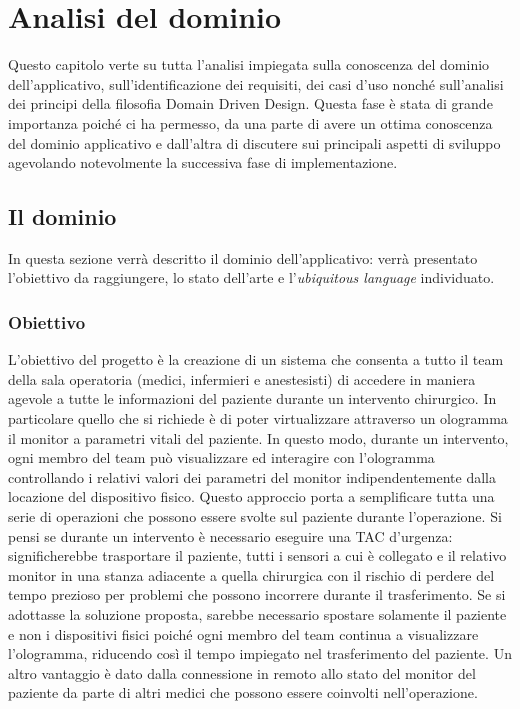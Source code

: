 
\chapter{Analisi del dominio}
Questo capitolo verte su tutta l'analisi impiegata sulla conoscenza del dominio dell'applicativo, sull'identificazione dei requisiti, dei casi d'uso nonché sull'analisi dei principi della filosofia Domain Driven Design. \newline \newline Questa fase è stata di grande importanza poiché ci ha permesso, da una parte di avere un ottima conoscenza del dominio applicativo e dall'altra di discutere sui principali aspetti di sviluppo agevolando notevolmente la successiva fase di implementazione.

\section{Il dominio}
In questa sezione verrà descritto il dominio dell'applicativo: verrà presentato l'obiettivo da raggiungere, lo stato dell'arte e l'\textit{ubiquitous language} individuato.
 
\subsection{Obiettivo}

L'obiettivo del progetto è la creazione di un sistema che consenta a tutto il team della sala operatoria (medici, infermieri e anestesisti) di accedere in maniera agevole a tutte le informazioni del paziente durante un intervento chirurgico. In particolare quello che si richiede è di poter virtualizzare attraverso un ologramma il monitor a parametri vitali del paziente. In questo modo, durante un intervento, ogni membro del team può visualizzare ed interagire con l'ologramma controllando i relativi valori dei parametri del monitor indipendentemente dalla locazione del dispositivo fisico. \newline \newline Questo approccio porta a semplificare tutta una serie di operazioni che possono essere svolte sul paziente durante l'operazione. Si pensi se durante un intervento è necessario eseguire una TAC d'urgenza: significherebbe trasportare il paziente, tutti i sensori a cui è collegato e il relativo monitor in una stanza adiacente a quella chirurgica con il rischio di perdere del tempo prezioso per problemi che possono incorrere durante il trasferimento. Se si adottasse la soluzione proposta, sarebbe necessario spostare solamente il paziente e non i dispositivi fisici poiché ogni membro del team continua a visualizzare l'ologramma, riducendo così il tempo impiegato nel trasferimento del paziente.
Un altro vantaggio è dato dalla connessione in remoto allo stato del monitor del paziente da parte di altri medici che possono essere coinvolti nell'operazione.

